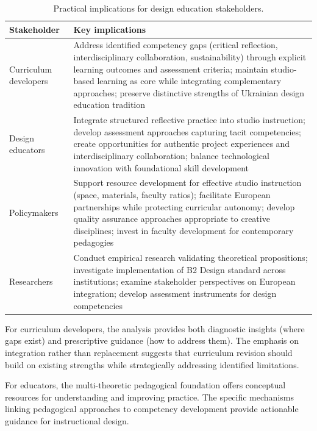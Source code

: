 \documentclass[ed]{acnsart}
\begin{document}
	\begin{table}[b]
		\centering
		\caption{Practical implications for design education stakeholders.}
		\label{tab:implications}
		\small
		\begin{tabularx}{\textwidth}{@{}lX@{}}
			\toprule
			\hfill\textbf{Stakeholder} & \hfil\textbf{Key implications} \\
			\midrule
			Curriculum developers & Address identified competency gaps (critical reflection, interdisciplinary collaboration, sustainability) through explicit learning outcomes and assessment criteria; maintain studio-based learning as core while integrating complementary approaches; preserve distinctive strengths of Ukrainian design education tradition \\
			\addlinespace
			Design educators & Integrate structured reflective practice into studio instruction; develop assessment approaches capturing tacit competencies; create opportunities for authentic project experiences and interdisciplinary collaboration; balance technological innovation with foundational skill development \\
			\addlinespace
			Policymakers & Support resource development for effective studio instruction (space, materials, faculty ratios); facilitate European partnerships while protecting curricular autonomy; develop quality assurance approaches appropriate to creative disciplines; invest in faculty development for contemporary pedagogies \\
			\addlinespace
			Researchers & Conduct empirical research validating theoretical propositions; investigate implementation of B2 Design standard across institutions; examine stakeholder perspectives on European integration; develop assessment instruments for design competencies \\
			\bottomrule
		\end{tabularx}
	\end{table}
	
	For curriculum developers, the analysis provides both diagnostic insights (where gaps exist) and prescriptive guidance (how to address them). The emphasis on integration rather than replacement suggests that curriculum revision should build on existing strengths while strategically addressing identified limitations.
	
	For educators, the multi-theoretic pedagogical foundation offers conceptual resources for understanding and improving practice. The specific mechanisms linking pedagogical approaches to competency development provide actionable guidance for instructional design.
	
\end{document}
